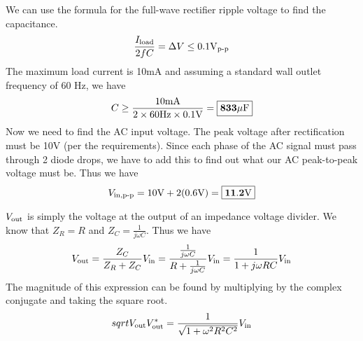 \documentclass{article}
\begin{document}
    We can use the formula for the full-wave rectifier ripple voltage to find the capacitance.
    \[\frac{I_{\text{load}}}{2fC} = \Delta V \le 0.1 \text{V}_{\text{p-p}}\]
    The maximum load current is 10mA and assuming a standard wall outlet frequency of 60 Hz, we have
    \[C \ge \frac{10\text{m}\text{A}}{2\times 60\text{Hz} \times 0.1\text{V}} = \boxed{\mathbf{833 \mu\text{F}}}\]
    Now we need to find the AC input voltage. The peak voltage after rectification must be 10V (per the requirements). Since each phase of the AC signal must pass through 2 diode drops, we have to add this to find out what our AC peak-to-peak voltage must be. Thus we have
    \[V_{\text{in}, \text{p-p}} = 10\text{V} + 2(0.6\text{V}) = \boxed{\mathbf{11.2\text{V}}}\]

    $V_{\text{out}}$ is simply the voltage at the output of an impedance voltage divider. We know that $Z_R = R$ and $Z_C = \frac{1}{j\omega C}$. Thus we have 
    \[V_{\text{out}} = \frac{Z_C}{Z_R + Z_C} V_{\text{in}} = \frac{\frac{1}{j \omega C}}{R + \frac{1}{j \omega C}} V_{\text{in}} = \frac{1}{1 + j \omega R C} V_{\text{in}}\]
    The magnitude of this expression can be found by multiplying by the complex conjugate and taking the square root.
    \[sqrt{V_{\text{out}} V_{\text{out}}^*} = \frac{1}{\sqrt{1 + \omega^2R^2C^2}}V_{\text{in}}\]
    
\end{document}
